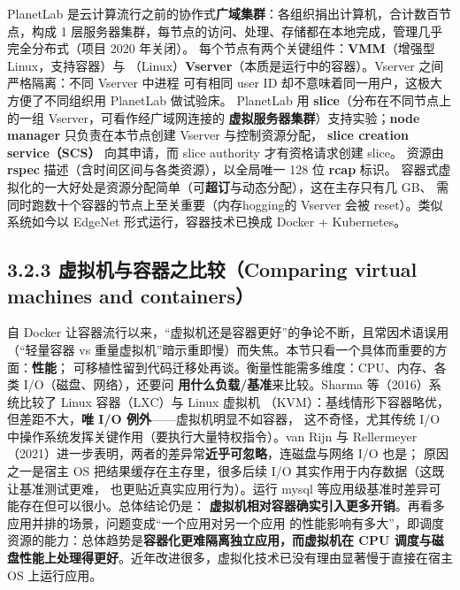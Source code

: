 \begin{ideabox}
PlanetLab 是云计算流行之前的协作式\textbf{广域集群}：各组织捐出计算机，合计数百节点，构成
1 层服务器集群，每节点的访问、处理、存储都在本地完成，管理几乎完全分布式（项目 2020 年关闭）。
每个节点有两个关键组件：\textbf{VMM}（增强型 Linux，支持容器）与
（Linux）\textbf{Vserver}（本质是运行中的容器）。Vserver 之间严格隔离：不同 Vserver 中进程
可有相同 user ID 却不意味着同一用户，这极大方便了不同组织用 PlanetLab 做试验床。
PlanetLab 用 \textbf{slice}（分布在不同节点上的一组 Vserver，可看作经广域网连接的
\textbf{虚拟服务器集群}）支持实验；\textbf{node manager} 只负责在本节点创建 Vserver 与控制资源分配，
\textbf{slice creation service（SCS）} 向其申请，而 slice authority 才有资格请求创建 slice。
资源由 \textbf{rspec} 描述（含时间区间与各类资源），以全局唯一 128 位 \textbf{rcap} 标识。
容器式虚拟化的一大好处是资源分配简单（可\textbf{超订}与动态分配），这在主存只有几 GB、
需同时跑数十个容器的节点上至关重要（内存hogging的 Vserver 会被 reset）。类似系统如今以
EdgeNet 形式运行，容器技术已换成 Docker + Kubernetes。
\end{ideabox}

\begin{closeread}
\end{closeread}


\subsection*{3.2.3 虚拟机与容器之比较（Comparing virtual machines and containers）}
自 Docker 让容器流行以来，“虚拟机还是容器更好”的争论不断，且常因术语误用
（“轻量容器 vs 重量虚拟机”暗示重即慢）而失焦。本节只看一个具体而重要的方面：\textbf{性能}；
可移植性留到代码迁移处再谈。衡量性能需多维度：CPU、内存、各类 I/O（磁盘、网络），还要问
\textbf{用什么负载/基准}来比较。Sharma 等（2016）系统比较了 Linux 容器（LXC）与 Linux 虚拟机
（KVM）：基线情形下容器略优，但差距不大，\textbf{唯 I/O 例外}——虚拟机明显不如容器，
这不奇怪，尤其传统 I/O 中操作系统发挥关键作用（要执行大量特权指令）。van Rijn 与
Rellermeyer（2021）进一步表明，两者的差异常\textbf{近乎可忽略}，连磁盘与网络 I/O 也是；
原因之一是宿主 OS 把结果缓存在主存里，很多后续 I/O 其实作用于内存数据（这既让基准测试更难，
也更贴近真实应用行为）。运行 mysql 等应用级基准时差异可能存在但可以很小。总体结论仍是：
\textbf{虚拟机相对容器确实引入更多开销}。再看多应用并排的场景，问题变成“一个应用对另一个应用
的性能影响有多大”，即调度资源的能力：总体趋势是\textbf{容器化更难隔离独立应用，而虚拟机在
CPU 调度与磁盘性能上处理得更好}。近年改进很多，虚拟化技术已没有理由显著慢于直接在宿主 OS
上运行应用。

